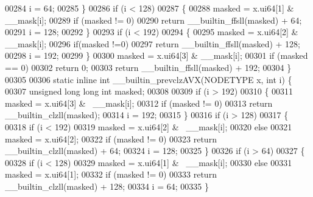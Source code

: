 \begin{DoxyCode}
00284                 i = 64;
00285         \}
00286         \textcolor{keywordflow}{if} (i < 128)
00287         \{
00288                 masked = x.ui64[1] & \_\_mask[i];
00289                 \textcolor{keywordflow}{if} (masked != 0)
00290                         \textcolor{keywordflow}{return} \_\_builtin\_ffsll(masked) + 64;
00291                 i = 128;
00292         \}
00293         \textcolor{keywordflow}{if} (i < 192)
00294         \{
00295                 masked = x.ui64[2] & \_\_mask[i];
00296                 \textcolor{keywordflow}{if}(masked !=0)
00297                         \textcolor{keywordflow}{return} \_\_builtin\_ffsll(masked) + 128;
00298                 i = 192;
00299         \}
00300         masked = x.ui64[3] & \_\_mask[i];
00301         \textcolor{keywordflow}{if} (masked == 0)
00302                 \textcolor{keywordflow}{return} 0;
00303         \textcolor{keywordflow}{return} \_\_builtin\_ffsll(masked) + 192;
00304 \}
00305 
00306 \textcolor{keyword}{static} \textcolor{keyword}{inline} \textcolor{keywordtype}{int} \_\_builtin\_prevclzAVX(NODETYPE x, \textcolor{keywordtype}{int} i) \{
00307         \textcolor{keywordtype}{unsigned} \textcolor{keywordtype}{long} \textcolor{keywordtype}{long} \textcolor{keywordtype}{int} masked;
00308 
00309         \textcolor{keywordflow}{if} (i > 192)
00310         \{
00311                 masked = x.ui64[3] & ~\_\_mask[i];
00312                 \textcolor{keywordflow}{if} (masked != 0)
00313                         \textcolor{keywordflow}{return} \_\_builtin\_clzll(masked);
00314                 i = 192;
00315         \}
00316         \textcolor{keywordflow}{if} (i > 128)
00317         \{
00318                 \textcolor{keywordflow}{if} (i < 192)
00319                         masked = x.ui64[2] & ~\_\_mask[i];
00320                 \textcolor{keywordflow}{else}
00321                         masked = x.ui64[2];
00322                 \textcolor{keywordflow}{if} (masked != 0)
00323                         \textcolor{keywordflow}{return} \_\_builtin\_clzll(masked) + 64;
00324                 i = 128;
00325         \}
00326         \textcolor{keywordflow}{if} (i > 64)
00327         \{
00328                 \textcolor{keywordflow}{if} (i < 128)
00329                         masked = x.ui64[1] & ~\_\_mask[i];
00330                 \textcolor{keywordflow}{else}
00331                         masked = x.ui64[1];
00332                 \textcolor{keywordflow}{if} (masked != 0)
00333                         \textcolor{keywordflow}{return} \_\_builtin\_clzll(masked) + 128;
00334                 i = 64;
00335         \}

\end{DoxyCode}
